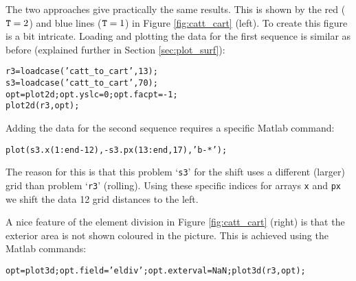 \documentclass[12pt]{report}
\begin{document}
The two approaches give practically the same results. This is shown by the
red (${\tt T}=2$) and blue lines (${\tt T}=1$) in Figure \ref{fig:catt_cart}
(left). To create this figure is a bit intricate. Loading and plotting the
data for the first sequence is similar as before (explained further in
Section \ref{sec:plot_surf}):
\begin{alltt}\small
r3=loadcase('catt_to_cart',13);  % "r3" = rolling, 3 units == case 13
s3=loadcase('catt_to_cart',70);  % "s3" = shift, 3 units == case 70
opt=plot2d; opt.yslc=0; opt.facpt=-1;
plot2d(r3,opt);
\end{alltt}
Adding the data for the second sequence requires a specific Matlab command:
\begin{alltt}\small
plot(s3.x(1:end-12), -s3.px(13:end,17), 'b-*');  % row 17 == centerline y=0.
\end{alltt}
The reason for this is that this problem `{\tt s3}' for the shift uses a
different (larger) grid than problem `{\tt r3}' (rolling). Using these
specific indices for arrays {\tt x} and {\tt px} we shift the data 12 grid
distances to the left.

A nice feature of the element division in Figure \ref{fig:catt_cart} (right)
is that the exterior area is not shown coloured in the picture. This is
achieved using the Matlab commands:
\begin{alltt}\small
opt=plot3d; opt.field='eldiv'; opt.exterval=NaN; plot3d(r3,opt);
\end{alltt}
\end{document}
